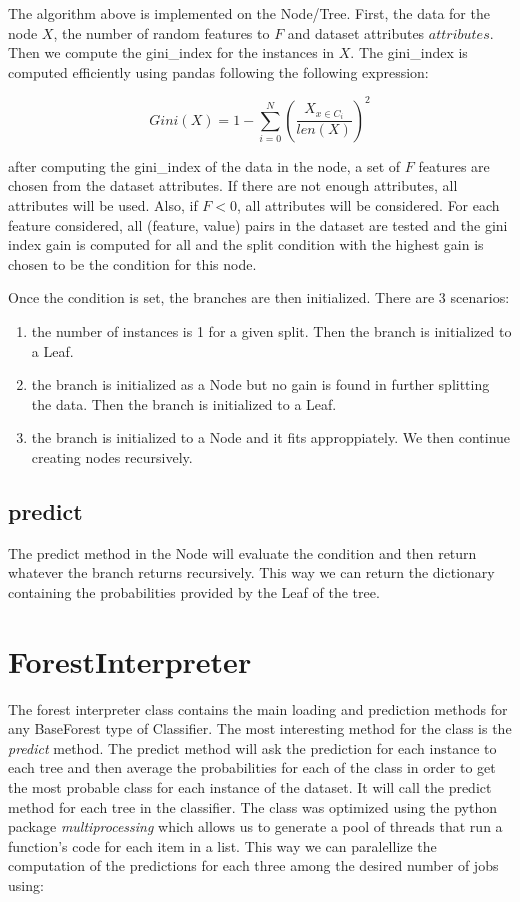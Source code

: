 The algorithm above is implemented on the Node/Tree. First, the data for the node $X$, the number of random features to $F$ and dataset attributes $attributes$. Then we compute the gini\_index for the instances in $X$. The gini\_index is computed efficiently using pandas following the following expression:

$$Gini(X) = 1 - \sum_{i=0}^{N} (\frac {X_{x \in C_i}} {len(X)})^2$$

after computing the gini\_index of the data in the node, a set of $F$ features are chosen from the dataset attributes. If there are not enough attributes, all attributes will be used. Also, if $F < 0$, all attributes will be considered. For each feature considered, all (feature, value) pairs in the dataset are tested and the gini index gain is computed for all and the split condition with the highest gain is chosen to be the condition for this node.

Once the condition is set, the branches are then initialized. There are 3 scenarios:
\begin{enumerate}
    \item the number of instances is 1 for a given split. Then the branch is initialized to a Leaf.
    \item the branch is initialized as a Node but no gain is found in further splitting the data. Then the branch is initialized to a Leaf.
    \item the branch is initialized to a Node and it fits approppiately. We then continue creating nodes recursively.
\end{enumerate}

\subsection{predict}

The predict method in the Node will evaluate the condition and then return whatever the branch returns recursively. This way we can return the dictionary containing the probabilities provided by the Leaf of the tree.

\section{ForestInterpreter}

The forest interpreter class contains the main loading and prediction methods for any BaseForest type of Classifier. The most interesting method for the class is the \textit{predict} method. The predict method will ask the prediction for each instance to each tree and then average the probabilities for each of the class in order to get the most probable class for each instance of the dataset. It will call the predict method for each tree in the classifier. 
The class was optimized using the python package \textit{multiprocessing} which allows us to generate a pool of threads that run a function's code for each item in a list. This way we can paralellize the computation of the predictions for each three among the desired number of jobs using:



